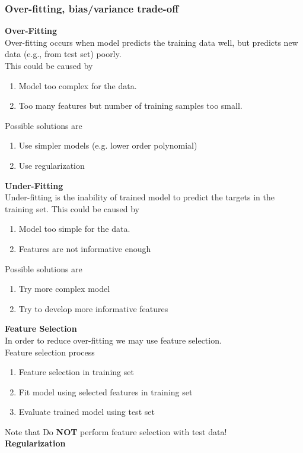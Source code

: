 \subsubsection{Over-fitting, bias/variance trade-off}
\textbf{Over-Fitting}\\
Over-fitting occurs when model predicts the training data well, but predicts new data (e.g., from test set) poorly. \\
This could be caused by
\begin{enumerate}
    \item Model too complex for the data.
    \item Too many features but number of training samples too small.
\end{enumerate}
Possible solutions are
\begin{enumerate}
    \item Use simpler models (e.g. lower order polynomial)
    \item Use regularization
\end{enumerate}
\textbf{Under-Fitting}\\
Under-fitting is the inability of trained model to predict the targets in the training set.
This could be caused by
\begin{enumerate}
    \item Model too simple for the data.
    \item Features are not informative enough
\end{enumerate}
Possible solutions are
\begin{enumerate}
    \item Try more complex model
    \item Try to develop more informative features
\end{enumerate}
\textbf{Feature Selection}\\
In order to reduce over-fitting we may use feature selection. \\
Feature selection process
\begin{enumerate}
    \item Feature selection in training set
    \item Fit model using selected features in training set
    \item Evaluate trained model using test set
\end{enumerate}
Note that {\color{red}Do \textbf{NOT} perform feature selection with test data!}\\
\textbf{Regularization} \\
